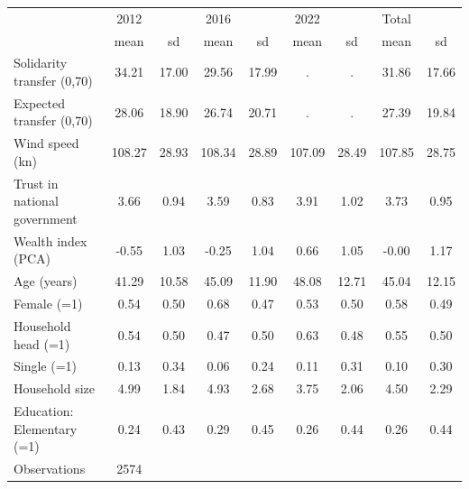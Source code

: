 \begin{tabular}{l*{4}{cc}}
\toprule
                &     2012&         &     2016&         &     2022&         &    Total&         \\
                &     mean&       sd&     mean&       sd&     mean&       sd&     mean&       sd\\
\midrule
Solidarity transfer (0,70)&    34.21&    17.00&    29.56&    17.99&        .&        .&    31.86&    17.66\\
Expected transfer (0,70)&    28.06&    18.90&    26.74&    20.71&        .&        .&    27.39&    19.84\\
Wind speed (kn) &   108.27&    28.93&   108.34&    28.89&   107.09&    28.49&   107.85&    28.75\\
Trust in national government&     3.66&     0.94&     3.59&     0.83&     3.91&     1.02&     3.73&     0.95\\
Wealth index (PCA)&    -0.55&     1.03&    -0.25&     1.04&     0.66&     1.05&    -0.00&     1.17\\
Age (years)     &    41.29&    10.58&    45.09&    11.90&    48.08&    12.71&    45.04&    12.15\\
Female (=1)     &     0.54&     0.50&     0.68&     0.47&     0.53&     0.50&     0.58&     0.49\\
Household head (=1)&     0.54&     0.50&     0.47&     0.50&     0.63&     0.48&     0.55&     0.50\\
Single (=1)     &     0.13&     0.34&     0.06&     0.24&     0.11&     0.31&     0.10&     0.30\\
Household size  &     4.99&     1.84&     4.93&     2.68&     3.75&     2.06&     4.50&     2.29\\
Education: Elementary (=1)&     0.24&     0.43&     0.29&     0.45&     0.26&     0.44&     0.26&     0.44\\
\midrule
Observations    &     2574&         &         &         &         &         &         &         \\
\bottomrule
\end{tabular}
